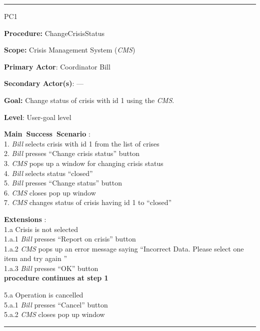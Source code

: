 \vspace{0.5cm}
\hrule
\begin{lyxlist}{PC1}
\small{
\item [\textbf{Procedure:}] ChangeCrisisStatus
\item [\textbf{Scope:}] Crisis Management System (\emph{CMS})
\item [\textbf{Primary Actor}:] Coordinator Bill
\item [\textbf{Secondary Actor(s)}:] ---
\item [\textbf{Goal:}] Change status of crisis with id 1 using the \emph{CMS}.
\item [\textbf{Level}:] User-goal level
\item [\textbf{Main~Success~Scenario}]:\\
1. \emph{Bill} selects crisis with id 1 from the list of crises\\
2. \emph{Bill} presses ``Change crisis status'' button\\
3. \emph{CMS} pops up a window for changing crisis status\\
4. \emph{Bill} selects status ``closed''\\
5. \emph{Bill} presses ``Change status'' button\\
6. \emph{CMS} closes pop up window\\
7. \emph{CMS} changes status of crisis having id 1 to ``closed''\\

\item [\textbf{Extensions}]:\\
1.a Crisis is not selected\\
\hspace*{0.5cm} 1.a.1 \emph{Bill} presses ``Report on crisis'' button\\
\hspace*{0.5cm} 1.a.2 \emph{CMS} pops up an error message saying ``Incorrect
Data. Please select one item and try again ''\\
\hspace*{0.5cm} 1.a.3 \emph{Bill} presses ``OK'' button\\
\hspace*{0.5cm} \textbf{procedure continues at step 1}

5.a Operation is cancelled\\
\hspace*{0.5cm} 5.a.1 \emph{Bill} presses ``Cancel'' button\\
\hspace*{0.5cm} 5.a.2 \emph{CMS} closes pop up window\\
}
\end{lyxlist}
\hrule
\vspace{0.5cm}